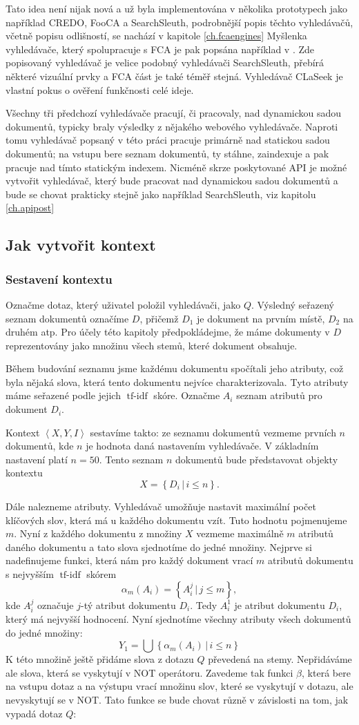 \documentclass[12pt]{article}
\newcommand{\name}{CLaSeek}
\newcommand{\sep}{\,|\,}
\newcommand{\ssection}[1]{\subsection{#1}}
\newcommand{\sssection}[1]{\subsubsection{#1}}
\newcommand{\adds}[1]{\left\{#1\right\}}
\newcommand{\addsp}[1]{\left<#1\right>}
\DeclareMathOperator{\tfidf}{tf-idf}
\newcommand{\context}{\addsp{X, Y, I}}
\begin{document}
Tato idea není nijak nová a už byla implementována v několika prototypech jako například CREDO, FooCA a SearchSleuth, podrobnější popis těchto vyhledávačů, včetně popisu odlišností, se nachází v kapitole \ref{ch.fcaengines} Myšlenka vyhledávače, který spolupracuje s FCA je pak popsána například v \cite{fcairslajdy}. Zde popisovaný vyhledávač je velice podobný vyhledávači SearchSleuth, přebírá některé vizuální prvky a FCA část je také téměř stejná. Vyhledávač \name{} je vlastní pokus o ověření funkčnosti celé ideje. 

Všechny tři předchozí vyhledávače pracují, či pracovaly, nad dynamickou sadou dokumentů, typicky braly výsledky z nějakého webového vyhledávače. Naproti tomu vyhledávač popsaný v této práci pracuje primárně nad statickou sadou dokumentů; na vstupu bere seznam dokumentů, ty stáhne, zaindexuje a pak pracuje nad tímto statickým indexem. Nicméně skrze poskytované API je možné vytvořit vyhledávač, který bude pracovat nad dynamickou sadou dokumentů a bude se chovat prakticky stejně jako například SearchSleuth, viz kapitolu \ref{ch.apipost}

\ssection{Jak vytvořit kontext}
\sssection{Sestavení kontextu}
\label{ch.sestaveni}
Označme dotaz, který uživatel položil vyhledávači, jako $Q$. Výsledný seřazený seznam dokumentů označíme $D$, přičemž $D_1$ je dokument na prvním místě, $D_2$ na druhém atp. Pro účely této kapitoly předpokládejme, že máme dokumenty v $D$ reprezentovány jako množinu všech stemů, které dokument obsahuje. 

Během budování seznamu jsme každému dokumentu spočítali jeho atributy, což byla nějaká slova, která tento dokumentu nejvíce charakterizovala. Tyto atributy máme seřazené podle jejich $\tfidf$ skóre. Označme $A_i$ seznam atributů pro dokument $D_i$.

Kontext $\context$ sestavíme takto: ze seznamu dokumentů vezmeme prvních $n$ dokumentů, kde $n$ je hodnota daná nastavením vyhledávače. V základním nastavení platí $n=50$. Tento seznam $n$ dokumentů bude představovat objekty kontextu
$$
X=\adds{D_i\sep i \le n}.
$$

Dále nalezneme atributy. Vyhledávač umožňuje nastavit maximální počet klíčových slov, která má u každého dokumentu vzít. Tuto hodnotu pojmenujeme $m$. Nyní z každého dokumentu z množiny $X$ vezmeme maximálně $m$ atributů daného dokumentu a tato slova sjednotíme do jedné množiny. Nejprve si nadefinujeme funkci, která nám pro každý dokument vrací $m$ atributů dokumentu s nejvyšším $\tfidf$ skórem
$$
\alpha_m(A_i)=\adds{A_i^j\sep j\le m},
$$
kde $A_i^j$ označuje $j$-tý atribut dokumentu $D_i$. Tedy $A_i^1$ je atribut dokumentu $D_i$, který má nejvyšší hodnocení. Nyní sjednotíme všechny atributy všech dokumentů do jedné množiny:
$$
Y_1=\bigcup\adds{\alpha_m(A_i)\sep i \le n}
$$
K této množině ještě přidáme slova z dotazu $Q$ převedená na stemy. Nepřidáváme ale slova, která se vyskytují v NOT operátoru. Zavedeme tak funkci $\beta$, která bere na vstupu dotaz a na výstupu vrací množinu slov, které se vyskytují v dotazu, ale nevyskytují se v NOT. Tato funkce se bude chovat různě v závislosti na tom, jak vypadá dotaz $Q$:
\end{document}
